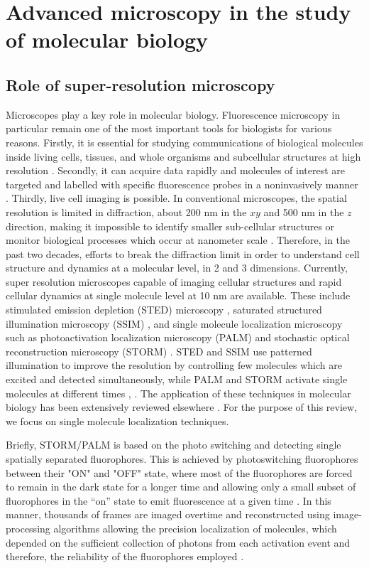 \section{Advanced microscopy in the study of molecular biology}
\subsection{Role of super-resolution microscopy }

Microscopes play a key role in molecular biology. Fluorescence microscopy in particular remain one of the most important tools for biologists for various reasons. Firstly, it is essential for studying communications of biological molecules inside living cells, tissues, and whole organisms and subcellular structures at high resolution \citep{Han2013}. Secondly, it can acquire data rapidly and molecules of interest are targeted and labelled with specific fluorescence probes in a noninvasively manner \citep{Han2013}. Thirdly, live cell imaging is possible. In conventional microscopes, the spatial resolution is limited in diffraction, about 200 nm in the $xy$ and 500 nm in the $z$ direction, making it impossible to identify smaller sub-cellular structures or monitor biological processes which occur at nanometer scale \citep{Xu2017}. Therefore, in the past two decades, efforts to break the diffraction limit in order to understand cell structure and dynamics at a molecular level, in 2 and 3 dimensions. Currently, super resolution microscopes capable of imaging cellular structures and rapid cellular dynamics at single molecule level at 10 nm are available. These include stimulated emission depletion (STED) microscopy \citep{Klar1999}, saturated structured illumination microscopy (SSIM) \citep{Gustafsson2005}, and single molecule localization microscopy such as  photoactivation localization microscopy (PALM) \citep{Betzig2006} and stochastic optical reconstruction microscopy (STORM) \citep{Huang2008,Xu2017}. STED and SSIM use patterned illumination to improve the resolution by controlling few molecules which are excited and detected simultaneously, while PALM and STORM activate single molecules at different times \citep{Han2013}, . The application of these techniques in molecular biology has been extensively reviewed elsewhere \citep{Han2013}. For the purpose of this review, we focus on single molecule localization techniques.  

Briefly, STORM/PALM is based on the photo switching and detecting single spatially separated fluorophores. This is achieved by photoswitching  fluorophores between their  "ON" and "OFF" state, where most of the fluorophores are forced to remain in the dark state for a longer time and allowing only a small subset of fluorophores  in  the “on” state to emit fluorescence at a given time \citep{Turkowyd2016}. In this manner, thousands of frames are imaged overtime  and reconstructed using image-processing algorithms allowing the precision localization of molecules, which depended on the sufficient collection of photons from each activation event and therefore, the reliability of the fluorophores employed \citep{Turkowyd2016,Xu2017}.

